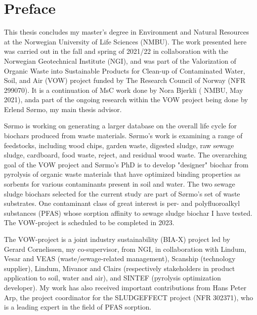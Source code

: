 \newpage
{}
\section*{Preface}
This thesis concludes my master's degree in Environment and Natural Resources at the Norwegian University of Life Sciences (NMBU). The work presented here was carried out in the fall and spring of 2021/22 in collaboration with the Norwegian Geotechnical Institute (NGI), and was part of the Valorization of Organic Waste into Sustainable Products for Clean-up of Contaminated Water, Soil, and Air (VOW) project funded by The Research Council of Norway (NFR 299070). It is a continuation of MsC work done by Nora Bjerkli ( NMBU, May 2021), anda part of the ongoing research within the VOW project being done by Erlend S\o rmo, my main thesis advisor. 

S\o rmo is working on generating a larger database on the overall life cycle for biochars produced from waste materials. S\o rmo's work is examining a range of feedstocks, including wood chips, garden waste, digested sludge, raw sewage sludge, cardboard, food waste, reject, and residual wood waste. The overarching goal of the VOW project and S\o rmo's PhD is to develop "designer" biochar from pyrolysis of organic waste materials that have optimized binding properties as sorbents for various contaminants present in soil and water. The two sewage sludge biochars selected for the current study are part of S\o rmo's set of waste substrates. One contaminant class of great interest is per- and polyfluoroalkyl substances (PFAS) whose sorption affinity to sewage sludge biochar I have tested. The VOW-project is scheduled to be completed in 2023.

The VOW-project is a joint industry sustainability (BIA-X) project led by Gerard Cornelissen, my co-supervisor, from NGI, in collaboration with Lindum, Vesar and VEAS (waste/sewage-related management),  Scanship (technology supplier), Lindum, Mivanor and Clairs (respectively stakeholders in product application to soil, water and air), and SINTEF (pyrolysis optimization developer). My work has also received important contributions from Hans Peter Arp, the project coordinator for the SLUDGEFFECT project (NFR 302371), who is a leading expert in the field of PFAS sorption.


